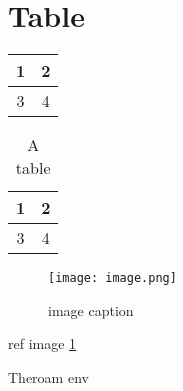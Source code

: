 \documentclass{article}
\begin{document}
    \newpage
    \section{Table}

    \begin{tabular}{|c|c|} %
        \hline 
        1 & 2 \\
        \hline
        3 & 4 \\
        \hline
    \end{tabular}

    \begin{table}
        \caption{A table}
        \begin{center}
            \begin{tabular}{|c|c|} 
                \hline 
                1 & 2 \\
                \hline
                3 & 4 \\
                \hline
            \end{tabular}
        \end{center}
    \end{table}

    \begin{figure}
        \centering
        \texttt{[image: image.png]}
        \caption{image caption}
        \label{image}
    \end{figure}

    ref image \ref{image}

    \begin{theorem}
        Theroam env 
    \end{theorem}
\end{document}
